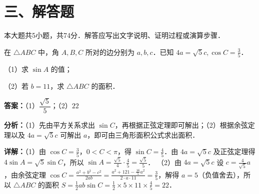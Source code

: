 \section*{三、解答题}
本大题共5小题，共74分．解答应写出文字说明、证明过程或演算步骤．

\begin{question}[points=14]
在 $\triangle ABC$ 中，角 $A,B,C$ 所对的边分别为 $a,b,c$．已知 $4a = \sqrt{5}c, \cos C = \frac{3}{5}$．

（1）求 $\sin A$ 的值；

（2）若 $b=11$，求 $\triangle ABC$ 的面积．
\begin{solution}
\textbf{答案：}（1）$\dfrac{\sqrt{5}}{5}$；（2）$22$

\textbf{分析：}（1）先由平方关系求出 $\sin C$，再根据正弦定理即可解出；（2）根据余弦定理以及 $4a=\sqrt{5}c$ 可解出 $a$，即可由三角形面积公式求出面积．

\textbf{详解：}（1）由 $\cos C = \frac{3}{5}$，$0<C<\pi$，得 $\sin C = \frac{4}{5}$．由 $4a=\sqrt{5}c$ 及正弦定理得 $4\sin A = \sqrt{5}\sin C$，所以 $\sin A = \frac{\sqrt{5}}{4}\cdot\frac{4}{5} = \frac{\sqrt{5}}{5}$．
（2）由 $4a=\sqrt{5}c$ 设 $c = \frac{4}{\sqrt{5}}a$，由余弦定理 $\cos C = \frac{a^2+b^2-c^2}{2ab} = \frac{a^2+121-\frac{16}{5}a^2}{2\cdot a\cdot11} = \frac{3}{5}$，解得 $a=5$（负值舍去），所以 $\triangle ABC$ 的面积 $S = \frac{1}{2}ab\sin C = \frac{1}{2}\times5\times11\times\frac{4}{5}=22$．
\end{solution}
\end{question}

